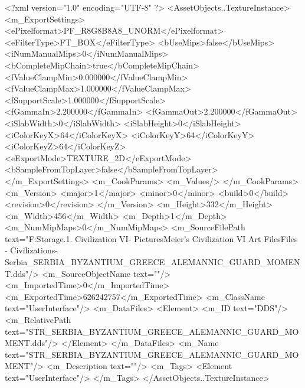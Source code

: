 <?xml version="1.0" encoding="UTF-8" ?>
<AssetObjects..TextureInstance>
	<m_ExportSettings>
		<ePixelformat>PF_R8G8B8A8_UNORM</ePixelformat>
		<eFilterType>FT_BOX</eFilterType>
		<bUseMips>false</bUseMips>
		<iNumManualMips>0</iNumManualMips>
		<bCompleteMipChain>true</bCompleteMipChain>
		<fValueClampMin>0.000000</fValueClampMin>
		<fValueClampMax>1.000000</fValueClampMax>
		<fSupportScale>1.000000</fSupportScale>
		<fGammaIn>2.200000</fGammaIn>
		<fGammaOut>2.200000</fGammaOut>
		<iSlabWidth>0</iSlabWidth>
		<iSlabHeight>0</iSlabHeight>
		<iColorKeyX>64</iColorKeyX>
		<iColorKeyY>64</iColorKeyY>
		<iColorKeyZ>64</iColorKeyZ>
		<eExportMode>TEXTURE_2D</eExportMode>
		<bSampleFromTopLayer>false</bSampleFromTopLayer>
	</m_ExportSettings>
	<m_CookParams>
		<m_Values/>
	</m_CookParams>
	<m_Version>
		<major>1</major>
		<minor>0</minor>
		<build>0</build>
		<revision>0</revision>
	</m_Version>
	<m_Height>332</m_Height>
	<m_Width>456</m_Width>
	<m_Depth>1</m_Depth>
	<m_NumMipMaps>0</m_NumMipMaps>
	<m_SourceFilePath text="F:\Mod Storage\2.1. Civilization VI\Mods\Archive - Pictures\Sid Meier's Civilization VI Art Files\Art Files - Civilizations\Civilization - Serbia\STR_SERBIA_BYZANTIUM_GREECE_ALEMANNIC_GUARD_MOMENT.dds"/>
	<m_SourceObjectName text=""/>
	<m_ImportedTime>0</m_ImportedTime>
	<m_ExportedTime>626242757</m_ExportedTime>
	<m_ClassName text="UserInterface"/>
	<m_DataFiles>
		<Element>
			<m_ID text="DDS"/>
			<m_RelativePath text="STR_SERBIA_BYZANTIUM_GREECE_ALEMANNIC_GUARD_MOMENT.dds"/>
		</Element>
	</m_DataFiles>
	<m_Name text="STR_SERBIA_BYZANTIUM_GREECE_ALEMANNIC_GUARD_MOMENT"/>
	<m_Description text=""/>
	<m_Tags>
		<Element text="UserInterface"/>
	</m_Tags>
</AssetObjects..TextureInstance>

